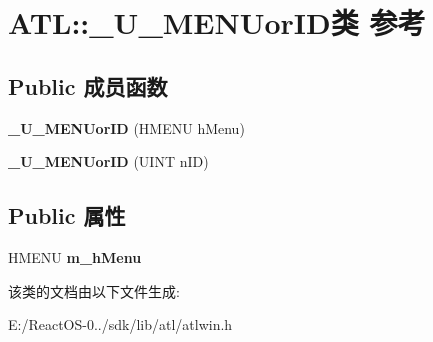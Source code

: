 \hypertarget{class_a_t_l_1_1___u___m_e_n_uor_i_d}{}\section{A\+TL\+:\+:\+\_\+\+U\+\_\+\+M\+E\+N\+Uor\+I\+D类 参考}
\label{class_a_t_l_1_1___u___m_e_n_uor_i_d}
\subsection*{Public 成员函数}
\begin{DoxyCompactItemize}
\item 
\mbox{\label{class_a_t_l_1_1___u___m_e_n_uor_i_d_a963db95038f50f9fd1955af4e0c7255d}} 
{\bfseries \+\_\+\+U\+\_\+\+M\+E\+N\+Uor\+ID} (H\+M\+E\+NU h\+Menu)
\item 
\mbox{\label{class_a_t_l_1_1___u___m_e_n_uor_i_d_a64a377b2dac0c160134468596b8f1289}} 
{\bfseries \+\_\+\+U\+\_\+\+M\+E\+N\+Uor\+ID} (U\+I\+NT n\+ID)
\end{DoxyCompactItemize}
\subsection*{Public 属性}
\begin{DoxyCompactItemize}
\item 
\mbox{\label{class_a_t_l_1_1___u___m_e_n_uor_i_d_a5869507cfe3f25ba0dcc5ab1561fd20f}} 
H\+M\+E\+NU {\bfseries m\+\_\+h\+Menu}
\end{DoxyCompactItemize}


该类的文档由以下文件生成\+:\begin{DoxyCompactItemize}
\item 
E\+:/\+React\+O\+S-\/0../sdk/lib/atl/atlwin.\+h\end{DoxyCompactItemize}
